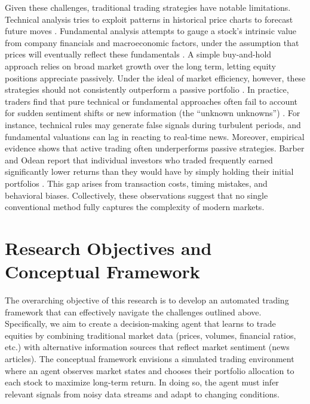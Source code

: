 Given these challenges, traditional trading strategies have notable limitations. Technical analysis tries to exploit patterns in historical price charts to forecast future moves \cite{Murphy1999}. Fundamental analysis attempts to gauge a stock's intrinsic value from company financials and macroeconomic factors, under the assumption that prices will eventually reflect these fundamentals \cite{Penman2013}. A simple buy-and-hold approach relies on broad market growth over the long term, letting equity positions appreciate passively. Under the ideal of market efficiency, however, these strategies should not consistently outperform a passive portfolio \cite{Malkiel2003}. In practice, traders find that pure technical or fundamental approaches often fail to account for sudden sentiment shifts or new information (the “unknown unknowns”) \cite{Taleb2007}. For instance, technical rules may generate false signals during turbulent periods, and fundamental valuations can lag in reacting to real-time news. Moreover, empirical evidence shows that active trading often underperforms passive strategies. Barber and Odean report that individual investors who traded frequently earned significantly lower returns than they would have by simply holding their initial portfolios \cite{Barber2000}. This gap arises from transaction costs, timing mistakes, and behavioral biases. Collectively, these observations suggest that no single conventional method fully captures the complexity of modern markets.

\section{Research Objectives and Conceptual Framework}
\label{sec:objectives}
The overarching objective of this research is to develop an automated trading framework that can effectively navigate the challenges outlined above. Specifically, we aim to create a decision-making agent that learns to trade equities by combining traditional market data (prices, volumes, financial ratios, etc.) with alternative information sources that reflect market sentiment (news articles). The conceptual framework envisions a simulated trading environment where an agent observes market states and chooses their portfolio allocation to each stock to maximize long-term return. In doing so, the agent must infer relevant signals from noisy data streams and adapt to changing conditions.

